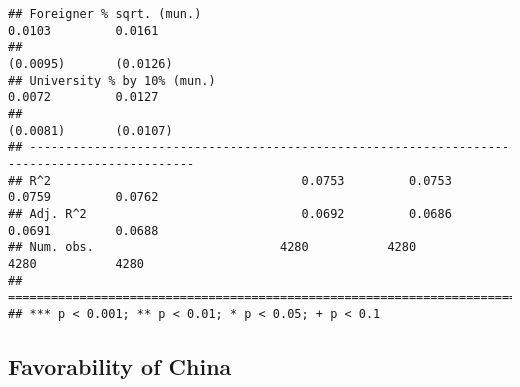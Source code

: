 \documentclass[
]{article}
\begin{document}
\begin{verbatim}
## Foreigner % sqrt. (mun.)                                            0.0103         0.0161    
##                                                                    (0.0095)       (0.0126)   
## University % by 10% (mun.)                                          0.0072         0.0127    
##                                                                    (0.0081)       (0.0107)   
## ---------------------------------------------------------------------------------------------
## R^2                                   0.0753         0.0753         0.0759         0.0762    
## Adj. R^2                              0.0692         0.0686         0.0691         0.0688    
## Num. obs.                          4280           4280           4280           4280         
## =============================================================================================
## *** p < 0.001; ** p < 0.01; * p < 0.05; + p < 0.1
\end{verbatim}

\hypertarget{favorability-of-china-5}{%
\subsection{Favorability of China}\label{favorability-of-china-5}}
\end{document}
